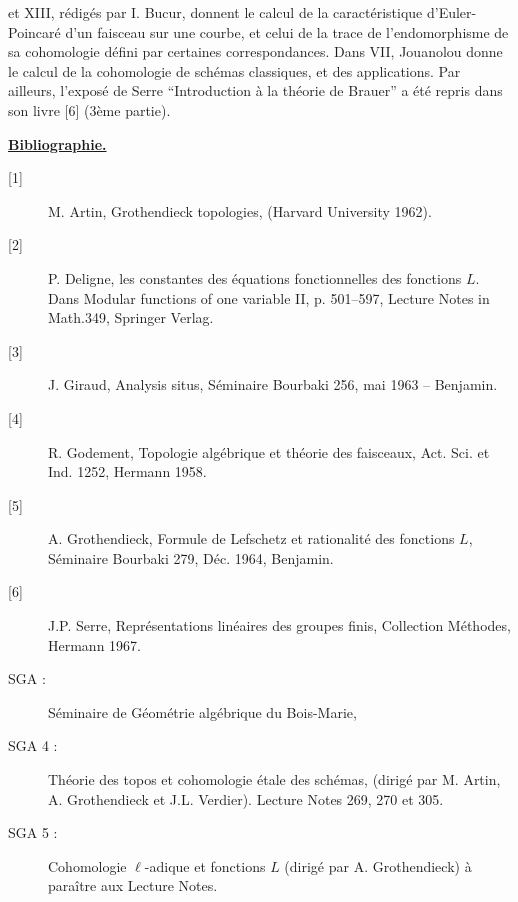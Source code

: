et XIII, rédigés par I. Bucur, donnent le calcul de la caractéristique
d'Euler-Poincaré d'un faisceau sur une courbe, et celui de la trace de
l'endomorphisme de sa cohomologie défini par certaines correspondances. Dans
VII, Jouanolou donne le calcul de la cohomologie de schémas classiques, et des
applications. Par ailleurs, l'exposé de Serre ``Introduction à la théorie de
Brauer'' a été repris dans son livre [6] (3ème partie).

\begin{center}
\textbf{\underline{Bibliographie.}}
\end{center}

\begin{description}
\item[{[1]}] M. Artin, Grothendieck topologies, (Harvard University 1962).
\item[{[2]}] P. Deligne, les constantes des équations fonctionnelles des
fonctions $L$. Dans Modular functions of one variable II, p. 501--597, Lecture
Notes in Math.349, Springer Verlag.
\item[{[3]}] J. Giraud, Analysis situs, Séminaire Bourbaki 256, mai 1963 --
Benjamin.
\item[{[4]}] R. Godement, Topologie algébrique et théorie des faisceaux, Act.
Sci. et Ind. 1252, Hermann 1958.
\item[{[5]}] A. Grothendieck, Formule de Lefschetz et rationalité des fonctions
$L$, Séminaire Bourbaki 279, Déc. 1964, Benjamin.
\item[{[6]}] J.P. Serre, Représentations linéaires des groupes finis,
Collection Méthodes, Hermann 1967.
\end{description}

\begin{description}
\item[SGA :] Séminaire de Géométrie algébrique du Bois-Marie,
\item[SGA 4 :] Théorie des topos et cohomologie étale des schémas, (dirigé par
M. Artin, A. Grothendieck et J.L. Verdier). Lecture Notes 269, 270 et 305.
\item[SGA 5 :] Cohomologie $\ell$-adique et fonctions $L$ (dirigé par A.
Grothendieck) à paraître aux Lecture Notes.
\end{description}
